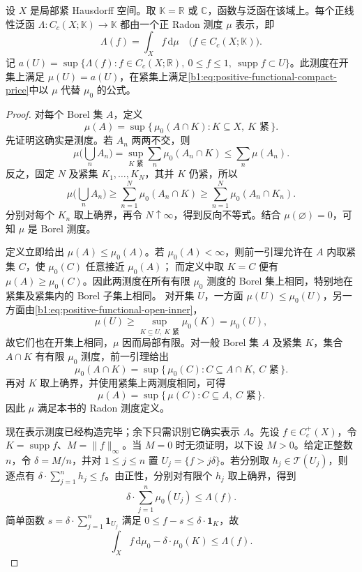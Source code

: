 \begin{theorem}[正泛函表示测度的存在性]\label{b1:thm:positive-radon-construction}
设 \(X\) 是局部紧 Hausdorff 空间。取 \(\mathbb K=\mathbb R\) 或 \(\mathbb C\)，函数与泛函在该域上。每个正线性泛函 \(\Lambda:C_c(X;\mathbb K)\rightarrow\mathbb K\) 都由一个正 Radon 测度 \(\mu\) 表示，即
\[
 \Lambda(f)=\int_X f\,\mathrm d\mu
 \quad\bigl(f\in C_c(X;\mathbb K)\bigr).
\]
记 \(a(U)=\sup\{\Lambda(f):f\in C_c(X;\mathbb R),\ 0\le f\le1,\ \operatorname{supp}f\subset U\}\)。此测度在开集上满足 \(\mu(U)=a(U)\)，在紧集上满足\eqref{b1:eq:positive-functional-compact-price}中以 \(\mu\) 代替 \(\mu_0\) 的公式。
\end{theorem}
\begin{proof}
对每个 Borel 集 \(A\)，定义
\[
 \mu(A)=\sup\{\,\mu_0(A\cap K):K\subseteq X,\ K\text{ 紧}\,\}.
\]
先证明这确实是测度。若 \(A_n\) 两两不交，则
\[
 \mu\biggl(\bigcup_n A_n\biggr)
 =\sup_{K\text{ 紧}}\sum_n\mu_0(A_n\cap K)
 \leq\sum_n\mu(A_n).
\]
反之，固定 \(N\) 及紧集 \(K_1,\ldots,K_N\)，其并 \(K\) 仍紧，所以
\[
 \mu\biggl(\bigcup_n A_n\biggr)
 \geq\sum_{n=1}^N\mu_0(A_n\cap K)
 \geq\sum_{n=1}^N\mu_0(A_n\cap K_n).
\]
分别对每个 \(K_n\) 取上确界，再令 \(N\uparrow\infty\)，得到反向不等式。结合 \(\mu(\varnothing)=0\)，可知 \(\mu\) 是 Borel 测度。

定义立即给出 \(\mu(A)\leq\mu_0(A)\)。若 \(\mu_0(A)<\infty\)，则前一引理允许在 \(A\) 内取紧集 \(C\)，使 \(\mu_0(C)\) 任意接近 \(\mu_0(A)\)；
而定义中取 \(K=C\) 便有 \(\mu(A)\geq\mu_0(C)\)。因此两测度在所有有限 \(\mu_0\) 测度的 Borel 集上相同，特别地在紧集及紧集内的 Borel 子集上相同。
对开集 \(U\)，一方面 \(\mu(U)\leq\mu_0(U)\)，另一方面由\eqref{b1:eq:positive-functional-open-inner}，
\[
 \mu(U)\geq\sup_{K\subseteq U,\ K\text{ 紧}}\mu_0(K)=\mu_0(U),
\]
故它们也在开集上相同，\(\mu\) 因而局部有限。对一般 Borel 集 \(A\) 及紧集 \(K\)，集合 \(A\cap K\) 有有限 \(\mu_0\) 测度，前一引理给出
\[
 \mu_0(A\cap K)
 =\sup\{\,\mu_0(C):C\subseteq A\cap K,\ C\text{ 紧}\,\}.
\]
再对 \(K\) 取上确界，并使用紧集上两测度相同，可得
\[
 \mu(A)=\sup\{\,\mu(C):C\subseteq A,\ C\text{ 紧}\,\}.
\]
因此 \(\mu\) 满足本书的 Radon 测度定义。

现在表示测度已经构造完毕；余下只需识别它确实表示 \(\Lambda\)。先设 \(f\in C_c^+(X)\)，令 \(K=\operatorname{supp}f\)、\(M=\|f\|_\infty\)。当 \(M=0\) 时无须证明，以下设 \(M>0\)。给定正整数 \(n\)，令 \(\delta=M/n\)，并对 \(1\leq j\leq n\) 置 \(U_j=\{f>j\delta\}\)。若分别取 \(h_j\in\mathcal T(U_j)\)，则逐点有 \(\delta\cdot\sum_{j=1}^n h_j\leq f\)。由正性，分别对有限个 \(h_j\) 取上确界，得到
\[
 \delta\cdot\sum_{j=1}^n\mu_0(U_j)\leq\Lambda(f).
\]
简单函数 \(s=\delta\cdot\sum_{j=1}^n\mathbf1_{U_j}\) 满足 \(0\leq f-s\leq\delta\cdot\mathbf1_K\)，故
\begin{equation}\label{b1:eq:positive-functional-integral-lower}
 \int_X f\,\mathrm d\mu_0-\delta\cdot\mu_0(K)\leq\Lambda(f).
\end{equation}


\end{proof}
